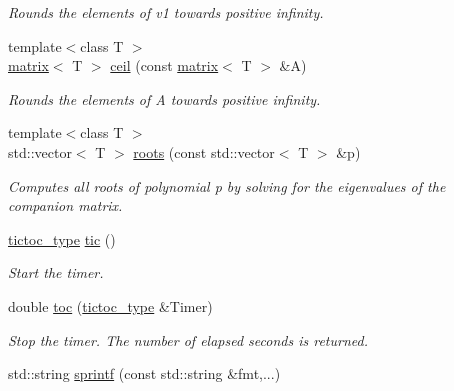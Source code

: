 \begin{DoxyCompactItemize}
\begin{DoxyCompactList}\small\item\em Rounds the elements of v1 towards positive infinity. \end{DoxyCompactList}\item 
\hypertarget{namespacekeycpp_a4bba31744fef3693901a075fda07857c}{{\footnotesize template$<$class T $>$ }\\\hyperlink{classkeycpp_1_1matrix}{matrix}$<$ T $>$ \hyperlink{namespacekeycpp_a4bba31744fef3693901a075fda07857c}{ceil} (const \hyperlink{classkeycpp_1_1matrix}{matrix}$<$ T $>$ \&A)}\label{namespacekeycpp_a4bba31744fef3693901a075fda07857c}

\begin{DoxyCompactList}\small\item\em Rounds the elements of A towards positive infinity. \end{DoxyCompactList}\item 
\hypertarget{namespacekeycpp_a7752b443d306871030c8867467fe6cc9}{{\footnotesize template$<$class T $>$ }\\std\-::vector$<$ T $>$ \hyperlink{namespacekeycpp_a7752b443d306871030c8867467fe6cc9}{roots} (const std\-::vector$<$ T $>$ \&p)}\label{namespacekeycpp_a7752b443d306871030c8867467fe6cc9}

\begin{DoxyCompactList}\small\item\em Computes all roots of polynomial p by solving for the eigenvalues of the companion matrix. \end{DoxyCompactList}\item 
\hypertarget{namespacekeycpp_a6069a9eec0edfa1d401230013d98765e}{\hyperlink{structkeycpp_1_1tictoc__type}{tictoc\-\_\-type} \hyperlink{namespacekeycpp_a6069a9eec0edfa1d401230013d98765e}{tic} ()}\label{namespacekeycpp_a6069a9eec0edfa1d401230013d98765e}

\begin{DoxyCompactList}\small\item\em Start the timer. \end{DoxyCompactList}\item 
\hypertarget{namespacekeycpp_afe03fbbb5126729fb4b9367097acb1d1}{double \hyperlink{namespacekeycpp_afe03fbbb5126729fb4b9367097acb1d1}{toc} (\hyperlink{structkeycpp_1_1tictoc__type}{tictoc\-\_\-type} \&Timer)}\label{namespacekeycpp_afe03fbbb5126729fb4b9367097acb1d1}

\begin{DoxyCompactList}\small\item\em Stop the timer. The number of elapsed seconds is returned. \end{DoxyCompactList}\item 
\hypertarget{namespacekeycpp_a9d70a761d33bbc2bdec6b4e0eb43d517}{std\-::string \hyperlink{namespacekeycpp_a9d70a761d33bbc2bdec6b4e0eb43d517}{sprintf} (const std\-::string \&fmt,...)}\label{namespacekeycpp_a9d70a761d33bbc2bdec6b4e0eb43d517}


\end{DoxyCompactItemize}
